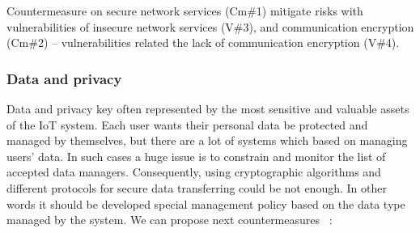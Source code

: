 \documentclass[12pt]{article}
\begin{document}
Countermeasure on secure network services (Cm\#1) mitigate risks with vulnerabilities of insecure network services (V\#3), and communication encryption
(Cm\#2) – vulnerabilities related the lack of communication encryption (V\#4).

\subsubsection{Data and privacy} 
Data and privacy key often represented by the most sensitive and valuable assets of the IoT system. Each user wants their personal data be protected and managed by themselves, but there are a lot of  systems which based on managing users' data. In such cases a huge issue is to constrain and monitor the list of accepted data managers. Consequently, using cryptographic algorithms and different protocols for secure data transferring could be not enough.  In other words it should be developed special management policy based on the data type managed by the system. We can propose next countermeasures ~\cite{OWASP}:
\end{document}
